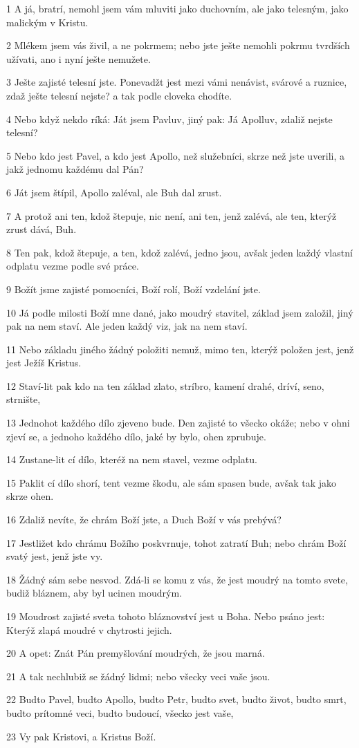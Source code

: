 \par 1 A já, bratrí, nemohl jsem vám mluviti jako duchovním, ale jako telesným, jako malickým v Kristu.
\par 2 Mlékem jsem vás živil, a ne pokrmem; nebo jste ješte nemohli pokrmu tvrdších užívati, ano i nyní ješte nemužete.
\par 3 Ješte zajisté telesní jste. Ponevadžt jest mezi vámi nenávist, svárové a ruznice, zdaž ješte telesní nejste? a tak podle cloveka chodíte.
\par 4 Nebo když nekdo ríká: Ját jsem Pavluv, jiný pak: Já Apolluv, zdaliž nejste telesní?
\par 5 Nebo kdo jest Pavel, a kdo jest Apollo, než služebníci, skrze než jste uverili, a jakž jednomu každému dal Pán?
\par 6 Ját jsem štípil, Apollo zaléval, ale Buh dal zrust.
\par 7 A protož ani ten, kdož štepuje, nic není, ani ten, jenž zalévá, ale ten, kterýž zrust dává, Buh.
\par 8 Ten pak, kdož štepuje, a ten, kdož zalévá, jedno jsou, avšak jeden každý vlastní odplatu vezme podle své práce.
\par 9 Božít jsme zajisté pomocníci, Boží rolí, Boží vzdelání jste.
\par 10 Já podle milosti Boží mne dané, jako moudrý stavitel, základ jsem založil, jiný pak na nem staví. Ale jeden každý viz, jak na nem staví.
\par 11 Nebo základu jiného žádný položiti nemuž, mimo ten, kterýž položen jest, jenž jest Ježíš Kristus.
\par 12 Staví-lit pak kdo na ten základ zlato, stríbro, kamení drahé, dríví, seno, strnište,
\par 13 Jednohot každého dílo zjeveno bude. Den zajisté to všecko okáže; nebo v ohni zjeví se, a jednoho každého dílo, jaké by bylo, ohen zprubuje.
\par 14 Zustane-lit cí dílo, kteréž na nem stavel, vezme odplatu.
\par 15 Paklit cí dílo shorí, tent vezme škodu, ale sám spasen bude, avšak tak jako skrze ohen.
\par 16 Zdaliž nevíte, že chrám Boží jste, a Duch Boží v vás prebývá?
\par 17 Jestližet kdo chrámu Božího poskvrnuje, tohot zatratí Buh; nebo chrám Boží svatý jest, jenž jste vy.
\par 18 Žádný sám sebe nesvod. Zdá-li se komu z vás, že jest moudrý na tomto svete, budiž bláznem, aby byl ucinen moudrým.
\par 19 Moudrost zajisté sveta tohoto bláznovství jest u Boha. Nebo psáno jest: Kterýž zlapá moudré v chytrosti jejich.
\par 20 A opet: Znát Pán premyšlování moudrých, že jsou marná.
\par 21 A tak nechlubiž se žádný lidmi; nebo všecky veci vaše jsou.
\par 22 Budto Pavel, budto Apollo, budto Petr, budto svet, budto život, budto smrt, budto prítomné veci, budto budoucí, všecko jest vaše,
\par 23 Vy pak Kristovi, a Kristus Boží.


